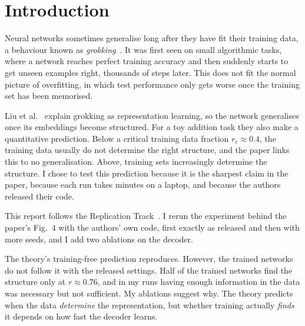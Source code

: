 \section{Introduction}
\label{sec:intro}

Neural networks sometimes generalise long after they have fit their training
data, a behaviour known as \emph{grokking}~\cite{power2022grokking}. It was
first seen on small algorithmic tasks, where a network reaches perfect
training accuracy and then suddenly starts to get unseen examples right, thousands of steps later. 
This does not fit the normal picture of overfitting,
in which test performance only gets worse once the training set has been
memorised.

Liu et al.~\cite{liu2022grokking} explain grokking as representation
learning, so the network generalises once its embeddings become structured. For a
toy addition task they also make a quantitative prediction. Below a critical
training data fraction $r_c \approx 0.4$, the training data usually do not determine the right structure, and the paper
links this to no generalisation. Above, training sets increasingly determine the structure. I chose to test
this prediction because it is the sharpest claim in the paper, because each
run takes minutes on a laptop, and because the authors released their code.

This report follows the Replication Track~\cite{pineau2021reproducibility}. I
rerun the experiment behind the paper's Fig.~4 with the authors' own code,
first exactly as released and then with more seeds, and I add two ablations
on the decoder.

The theory's training-free prediction reproduces. However, the trained networks
do not follow it with the released settings. Half of the trained networks find the
structure only at $r \approx 0.76$, and in my runs having enough information in
the data was necessary but not sufficient. My ablations suggest why.
The theory predicts when the data \emph{determine} the representation, but
whether training actually \emph{finds} it depends on how fast the decoder
learns.
